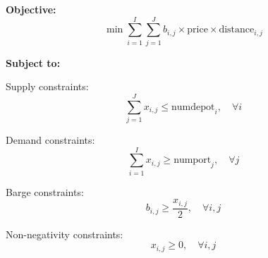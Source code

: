 \documentclass{article}
\begin{document}
\textbf{Objective:}
\[
\min \sum_{i=1}^{I} \sum_{j=1}^{J} b_{i,j} \times \text{price} \times \text{distance}_{i,j}
\]

\textbf{Subject to:}

Supply constraints:
\[
\sum_{j=1}^{J} x_{i,j} \leq \text{numdepot}_i, \quad \forall i
\]

Demand constraints:
\[
\sum_{i=1}^{I} x_{i,j} \geq \text{numport}_j, \quad \forall j
\]

Barge constraints:
\[
b_{i,j} \geq \frac{x_{i,j}}{2}, \quad \forall i, j
\]

Non-negativity constraints:
\[
x_{i,j} \geq 0, \quad \forall i, j
\]
\end{document}
